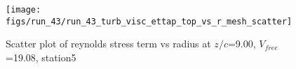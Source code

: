 \begin{figure}[H]
\centering
\texttt{[image: figs/run\_43/run\_43\_turb\_visc\_ettap\_top\_vs\_r\_mesh\_scatter]}
\caption{Scatter plot of reynolds stress term vs radius at $z/c$=9.00, $V_{free}$=19.08, station5}
\label{fig:run_43_turb_visc_ettap_top_vs_r_mesh_scatter}
\end{figure}


